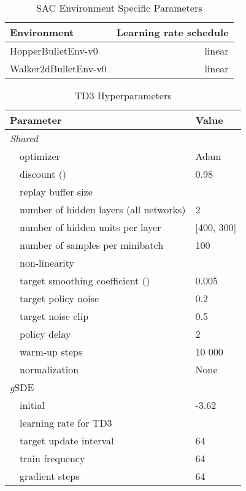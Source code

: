 \documentclass{article}
\newcommand{\ourSDE}{\textit{g}\textsc{SDE}\xspace}
\newcommand{\sac}{\textsc{SAC}\xspace}
\newcommand{\tddd}{\textsc{TD3}\xspace}
\begin{document}
\begin{table}[h]
\renewcommand{\arraystretch}{1.1}
\centering
\caption{\sac Environment Specific Parameters}
\label{tab:sac_env_params}
\vspace{1mm}
  \begin{tabular}{@{}l r@{}}
    \toprule
    Environment 	& Learning rate schedule\\
    \midrule
    HopperBulletEnv-v0  & linear\\
    Walker2dBulletEnv-v0 & linear\\
    \bottomrule
  \end{tabular}
\end{table}

\begin{table}[h]
\renewcommand{\arraystretch}{1.1}
\centering
\caption{\tddd Hyperparameters}
\label{tab:td3_shared_params}
\vspace{1mm}
  \begin{tabular}{@{}l l| l@{}}
    \toprule
    \multicolumn{2}{l|}{Parameter} &  Value\\
    \midrule
    \multicolumn{2}{l|}{\textit{Shared}}& \\
    & optimizer & Adam~\citep{kingma2014adam}\\
    & discount () &  0.98\\
    & replay buffer size & \\
    & number of hidden layers (all networks) & 2\\
    & number of hidden units per layer & [400, 300]\\
    & number of samples per minibatch & 100\\
    & non-linearity & \\
    & target smoothing coefficient ()& 0.005\\
    & target policy noise & 0.2 \\
    & target noise clip & 0.5 \\
    & policy delay & 2\\
    & warm-up steps & 10 000\\
    & normalization & None\\
    \midrule
    \multicolumn{2}{l|}{\ourSDE}& \\
    & initial  & -3.62\\
    & learning rate for \tddd & \\
    & target update interval & 64\\
    & train frequency & 64\\
    & gradient steps & 64\\

\end{tabular}
\end{table}
\end{document}
